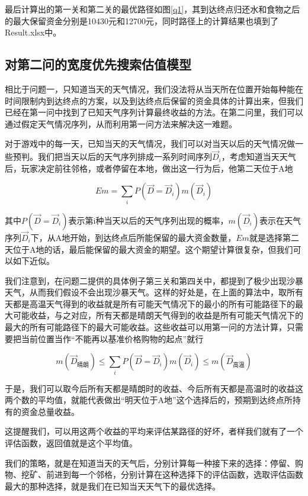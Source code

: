 \documentclass[withoutpreface,bwprint]{cumcmthesis} %
\begin{document}
最后计算出的第一关和第二关的最优路径如图\ref{q1}，其到达终点归还水和食物之后的最大保留资金分别是10430元和12700元，同时路径上的计算结果也填到了Result.xlsx中。

\subsection{对第二问的宽度优先搜索估值模型}

相比于问题一，只知道当天的天气情况，我们没法将从当天所在位置开始每种能在时间限制内到达终点的方案，以及到达终点后保留的资金具体的计算出来，但我们已经在第一问中找到了已知天气序列计算最终收益的方法。在第二问里，我们可以通过假定天气情况序列，从而利用第一问方法来解决这一难题。

对于游戏中的每一天，已知当天的天气情况，我们可以对当天以后的天气情况做一些预判。我们把当天以后的天气序列排成一系列时间序列\(\overrightarrow{D}_i\)，考虑知道当天天气后，玩家决定前往邻格，或者停留在本地，做出这一行为后，他第二天位于A地

\[
    E m=\sum_i P(\overrightarrow{D}=\overrightarrow{D}_i)m(\overrightarrow{D}_i)
\]

其中\(P(\overrightarrow{D}=\overrightarrow{D}_i)\)表示第i种当天以后的天气序列出现的概率，\(m(\overrightarrow{D}_i)\)表示在天气序列\(\overrightarrow{D}_i\)下，从A地开始，到达终点后所能保留的最大资金数量，\(E m\)就是选择第二天位于A地的话，最后能保留的最大资金的期望。这个期望计算很复杂，但我们可以如下近似。

我们注意到，在问题二提供的具体例子第三关和第四关中，都提到了极少出现沙暴天气，从而我们假设不会出现沙暴天气。这样的好处是，在上面的算法中，取所有天都是高温天气得到的收益就是所有可能天气情况下的最小的所有可能路径下的最大可能收益，与之对应，所有天都是晴朗天气得到的收益是所有可能天气情况下的最大的所有可能路径下的最大可能收益。这些收益可以用第一问的方法计算，只需要把当前位置当作“不能再以基准价格购物的起点”就行

\[
    m(\overrightarrow{D}_{\text{晴朗}}) \leq \sum_i P(\overrightarrow{D}=\overrightarrow{D}_i)m(\overrightarrow{D}_i) \leq m(\overrightarrow{D}_{\text{高温}})
\]

于是，我们可以取今后所有天都是晴朗时的收益、今后所有天都是高温时的收益这两个数的平均值，就能代表做出“明天位于A地”这个选择后的，预期到达终点所持有的资金总量收益。

这提醒我们，可以用这两个收益的平均来评估某路径的好坏，者样我们就有了一个评估函数，返回值就是这个平均值。

我们的策略，就是在知道当天的天气后，分别计算每一种接下来的选择：停留、购物、挖矿、前进到每一个邻格，分别计算在这种选择下的评估函数，选取评估函数最大的那种选择，就是我们在已知当天天气下的最优选择。
\end{document}
